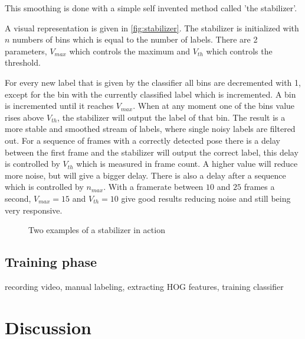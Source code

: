This smoothing is done with a simple self invented method called 'the stabilizer'.

A visual representation is given in \autoref{fig:stabilizer}. The stabilizer is initialized with $n$ numbers of bins which is equal to the number of labels. There are 2 parameters, $V_{max}$ which controls the maximum and $V_{th}$ which controls the threshold.

For every new label that is given by the classifier all bins are decremented with 1, except for the bin with the currently classified label which is incremented. A bin is incremented until it reaches $V_{max}$. When at any moment one of the bins value rises above $V_{th}$, the stabilizer will output the label of that bin. The result is a more stable and smoothed stream of labels, where single noisy labels are filtered out. For a sequence of frames with a correctly detected pose there is a delay between the first frame and the stabilizer will output the correct label, this delay is controlled by $V_{th}$ which is measured in frame count. A higher value will reduce more noise, but will give a bigger delay. There is also a delay after a sequence which is controlled by $n_{max}$. With a framerate between $10$ and $25$ frames a second, $V_{max} = 15$ and $V_{th} = 10$ give good results reducing noise and still being very responsive.

\begin{figure}[htbp]
  \centering
{}
\hspace{0.03\linewidth}
  \caption{Two examples of a stabilizer in action}
  \label{fig:stabilizer}
\end{figure}




\subsection*{Training phase}
recording video, manual labeling, extracting HOG features, training classifier

\section{Discussion}
